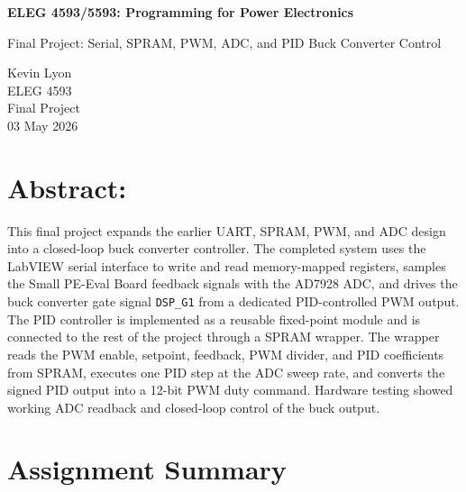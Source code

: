 \documentclass[12pt]{article}
\begin{document}
\thispagestyle{empty}
\begin{center}
  {\Huge \bfseries ELEG 4593/5593: Programming for Power Electronics\par}

  \vspace{2cm}

  {\Large Final Project: Serial, SPRAM, PWM, ADC, and PID Buck Converter Control\par}

  \vspace{3cm}
\end{center}

\vfill
\begin{flushright}
  Kevin Lyon\\[0.5cm]
  ELEG 4593\\
  Final Project\\
  03 May 2026
\end{flushright}
\newpage

\setcounter{page}{2}

\section*{Abstract:}

This final project expands the earlier UART, SPRAM, PWM, and ADC design into a closed-loop buck converter controller. The completed system uses the LabVIEW serial interface to write and read memory-mapped registers, samples the Small PE-Eval Board feedback signals with the AD7928 ADC, and drives the buck converter gate signal \texttt{DSP\_G1} from a dedicated PID-controlled PWM output. The PID controller is implemented as a reusable fixed-point module and is connected to the rest of the project through a SPRAM wrapper. The wrapper reads the PWM enable, setpoint, feedback, PWM divider, and PID coefficients from SPRAM, executes one PID step at the ADC sweep rate, and converts the signed PID output into a 12-bit PWM duty command. Hardware testing showed working ADC readback and closed-loop control of the buck output.

\newpage

\begingroup
\let\clearpage\relax
\tableofcontents
\vspace{1em}
\listoffigures
\vspace{1em}
\listoftables
\endgroup

\newpage

\section*{Assignment Summary}
\end{document}
